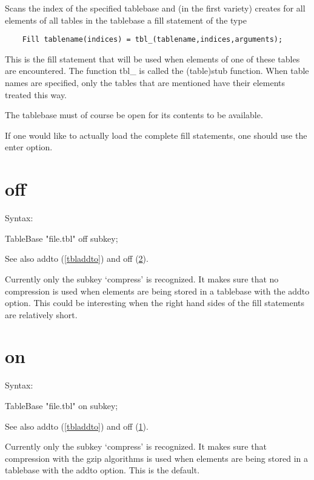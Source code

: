 \noindent Scans the index of the specified tablebase and (in 
the first variety) creates for all elements of all tables in the tablebase 
a fill statement of the type
\begin{verbatim}
    Fill tablename(indices) = tbl_(tablename,indices,arguments);
\end{verbatim}
This is the fill statement that will be used when elements of one of these 
tables are encountered. The function tbl\_ is called the (table)stub 
function. When table names are specified, only the tables that are 
mentioned have their elements treated this way.

\noindent The tablebase must of course be open for its contents to be 
available.

\noindent If one would like to actually load the complete fill statements, 
one should use the enter option.


\section{off}
\label{tbloff}

\noindent Syntax:

TableBase "file.tbl" off subkey;

\noindent See also addto (\ref{tbladdto}) and off (\ref{tblon}).

\noindent Currently only the subkey `compress' 
is recognized. It makes sure that no compression is used when elements are 
being stored in a tablebase with the addto option. This could 
be interesting when the right hand sides of the fill statements are 
relatively short.


\section{on}
\label{tblon}

\noindent Syntax:

TableBase "file.tbl" on subkey;

\noindent See also addto (\ref{tbladdto}) and off (\ref{tbloff}).

\noindent Currently only the subkey `compress' is 
recognized. It makes sure that compression with the gzip 
algorithms is used when elements are being stored in a tablebase with the 
addto option. This is the default.

